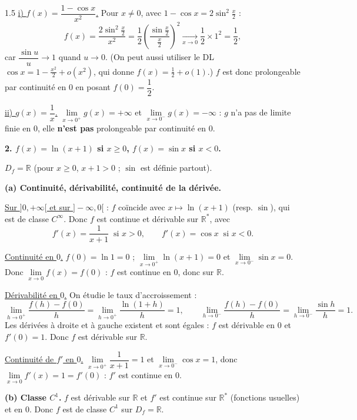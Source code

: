 \documentclass[12pt]{article}
\begin{document}
\begin{spacing}{1.5}
\underline{i) $f(x)=\dfrac{1-\cos x}{x^2}$.} Pour $x\neq0$, avec $1-\cos x=2\sin^2\frac x2$ :
\[
f(x)=\frac{2\sin^2\frac x2}{x^2}=\frac12\left(\frac{\sin\frac x2}{\frac x2}\right)^2\xrightarrow[x\to0]{}\frac12\times1^2=\frac12,
\]
car $\dfrac{\sin u}{u}\to1$ quand $u\to0$. (On peut aussi utiliser le DL $\cos x=1-\frac{x^2}{2}+o(x^2)$, qui donne $f(x)=\frac12+o(1)$.)
$f$ est donc prolongeable par continuité en $0$ en posant $f(0)=\dfrac12$.

\underline{ii) $g(x)=\dfrac1x$.} $\lim\limits_{x\to0^+}g(x)=+\infty$ et $\lim\limits_{x\to0^-}g(x)=-\infty$ : $g$ n'a pas de limite finie en $0$, elle \textbf{n'est pas} prolongeable par continuité en $0$.

\textbf{2. $f(x)=\ln(x+1)$ si $x\ge0$, $f(x)=\sin x$ si $x<0$.}

$D_f=\mathbb{R}$ (pour $x\ge0$, $x+1>0$ ; $\sin$ est définie partout).

\textbf{(a) Continuité, dérivabilité, continuité de la dérivée.}

\underline{Sur $]0,+\infty[$ et sur $]-\infty,0[$} : $f$ coïncide avec $x\mapsto\ln(x+1)$ (resp. $\sin$), qui est de classe $C^\infty$. Donc $f$ est continue et dérivable sur $\mathbb{R}^*$, avec
\[
f'(x)=\frac1{x+1}\ \text{ si } x>0,\qquad f'(x)=\cos x\ \text{ si } x<0 .
\]

\underline{Continuité en $0$.} $f(0)=\ln1=0$ ; $\lim\limits_{x\to0^+}\ln(x+1)=0$ et $\lim\limits_{x\to0^-}\sin x=0$. Donc $\lim\limits_{x\to0}f(x)=f(0)$ : $f$ est continue en $0$, donc sur $\mathbb{R}$.

\underline{Dérivabilité en $0$.} On étudie le taux d'accroissement :
\[
\lim_{h\to0^+}\frac{f(h)-f(0)}{h}=\lim_{h\to0^+}\frac{\ln(1+h)}{h}=1,\qquad
\lim_{h\to0^-}\frac{f(h)-f(0)}{h}=\lim_{h\to0^-}\frac{\sin h}{h}=1 .
\]
Les dérivées à droite et à gauche existent et sont égales : $f$ est dérivable en $0$ et $f'(0)=1$. Donc $f$ est dérivable sur $\mathbb{R}$.

\underline{Continuité de $f'$ en $0$.} $\lim\limits_{x\to0^+}\dfrac1{x+1}=1$ et $\lim\limits_{x\to0^-}\cos x=1$, donc $\lim\limits_{x\to0}f'(x)=1=f'(0)$ : $f'$ est continue en $0$.

\textbf{(b) Classe $C^1$.} $f$ est dérivable sur $\mathbb{R}$ et $f'$ est continue sur $\mathbb{R}^*$ (fonctions usuelles) et en $0$. Donc $f$ est de classe $C^1$ sur $D_f=\mathbb{R}$.


\end{spacing}
\end{document}
